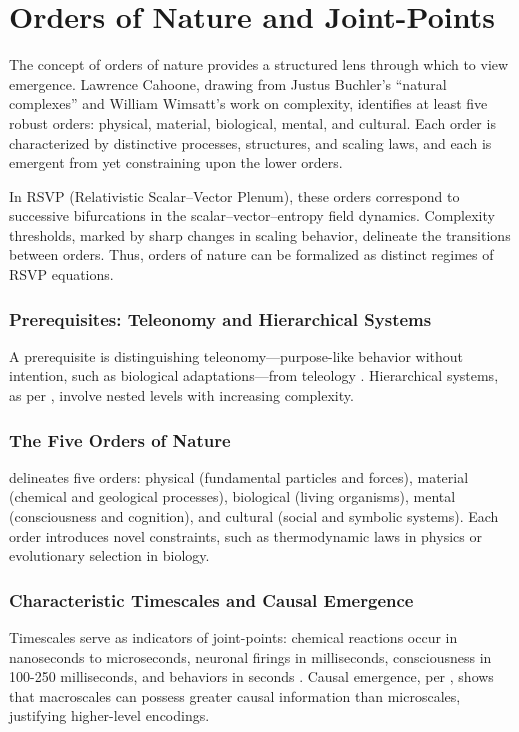 \documentclass[12pt]{book}
\begin{document}
\chapter{Orders of Nature and Joint-Points}
The concept of orders of nature provides a structured lens through which to view emergence. Lawrence Cahoone, drawing from Justus Buchler’s “natural complexes” and William Wimsatt’s work on complexity, identifies at least five robust orders: physical, material, biological, mental, and cultural. Each order is characterized by distinctive processes, structures, and scaling laws, and each is emergent from yet constraining upon the lower orders.

In RSVP (Relativistic Scalar–Vector Plenum), these orders correspond to successive bifurcations in the scalar–vector–entropy field dynamics. Complexity thresholds, marked by sharp changes in scaling behavior, delineate the transitions between orders. Thus, orders of nature can be formalized as distinct regimes of RSVP equations.

\subsection{Prerequisites: Teleonomy and Hierarchical Systems}
A prerequisite is distinguishing teleonomy—purpose-like behavior without intention, such as biological adaptations—from teleology \citep{Mayr1961, Monod1971}. Hierarchical systems, as per \citep{Salthe1985}, involve nested levels with increasing complexity.

\subsection{The Five Orders of Nature}
\citet{Cahoone2013} delineates five orders: physical (fundamental particles and forces), material (chemical and geological processes), biological (living organisms), mental (consciousness and cognition), and cultural (social and symbolic systems). Each order introduces novel constraints, such as thermodynamic laws in physics or evolutionary selection in biology.

\subsection{Characteristic Timescales and Causal Emergence}
Timescales serve as indicators of joint-points: chemical reactions occur in nanoseconds to microseconds, neuronal firings in milliseconds, consciousness in 100-250 milliseconds, and behaviors in seconds \citep{Damasio2010}. Causal emergence, per \citet{Hoel2017}, shows that macroscales can possess greater causal information than microscales, justifying higher-level encodings.
\end{document}
